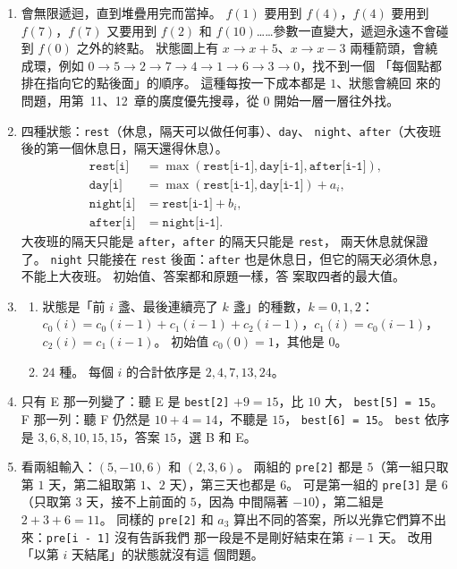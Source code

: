 \begin{enumerate}
\item 會無限遞迴，直到堆疊用完而當掉。 $f(1)$ 要用到 $f(4)$，$f(4)$ 要用到
$f(7)$，$f(7)$ 又要用到 $f(2)$ 和 $f(10)$……參數一直變大，遞迴永遠不會碰到
$f(0)$ 之外的終點。 狀態圖上有 $x \to x + 5$、$x \to x - 3$ 兩種箭頭，會繞
成環，例如 $0 \to 5 \to 2 \to 7 \to 4 \to 1 \to 6 \to 3 \to 0$，找不到一個
「每個點都排在指向它的點後面」的順序。 這種每按一下成本都是 $1$、狀態會繞回
來的問題，用第~11、12~章的廣度優先搜尋，從 $0$ 開始一層一層往外找。

\item 四種狀態：\texttt{rest}（休息，隔天可以做任何事）、\texttt{day}、
\texttt{night}、\texttt{after}（大夜班後的第一個休息日，隔天還得休息）。
\[
\begin{aligned}
\texttt{rest[i]}  &= \max(\texttt{rest[i-1]}, \texttt{day[i-1]}, \texttt{after[i-1]}),\\
\texttt{day[i]}   &= \max(\texttt{rest[i-1]}, \texttt{day[i-1]}) + a_i,\\
\texttt{night[i]} &= \texttt{rest[i-1]} + b_i,\\
\texttt{after[i]} &= \texttt{night[i-1]}.
\end{aligned}
\]
大夜班的隔天只能是 \texttt{after}，\texttt{after} 的隔天只能是 \texttt{rest}，
兩天休息就保證了。 \texttt{night} 只能接在 \texttt{rest} 後面：\texttt{after}
也是休息日，但它的隔天必須休息，不能上大夜班。 初始值、答案都和原題一樣，答
案取四者的最大值。

\item
\begin{enumerate}
\item 狀態是「前 $i$ 盞、最後連續亮了 $k$ 盞」的種數，$k = 0, 1, 2$：
$c_0(i) = c_0(i-1) + c_1(i-1) + c_2(i-1)$，$c_1(i) = c_0(i-1)$，
$c_2(i) = c_1(i-1)$。 初始值 $c_0(0) = 1$，其他是 $0$。
\item $24$ 種。 每個 $i$ 的合計依序是 $2, 4, 7, 13, 24$。
\end{enumerate}

\item 只有 E 那一列變了：聽 E 是 \texttt{best[2]} $+ 9 = 15$，比 $10$ 大，
\texttt{best[5] = 15}。 F 那一列：聽 F 仍然是 $10 + 4 = 14$，不聽是 $15$，
\texttt{best[6] = 15}。 \texttt{best} 依序是 $3, 6, 8, 10, 15, 15$，答案
$15$，選 B 和 E。

\item 看兩組輸入：$(5, -10, 6)$ 和 $(2, 3, 6)$。 兩組的 \texttt{pre[2]}
都是 $5$（第一組只取第 $1$ 天，第二組取第 $1$、$2$ 天），第三天也都是 $6$。
可是第一組的 \texttt{pre[3]} 是 $6$（只取第 $3$ 天，接不上前面的 $5$，因為
中間隔著 $-10$），第二組是 $2 + 3 + 6 = 11$。 同樣的 \texttt{pre[2]} 和
$a_3$ 算出不同的答案，所以光靠它們算不出來：\texttt{pre[i - 1]} 沒有告訴我們
那一段是不是剛好結束在第 $i - 1$ 天。 改用「以第 $i$ 天結尾」的狀態就沒有這
個問題。
\end{enumerate}
